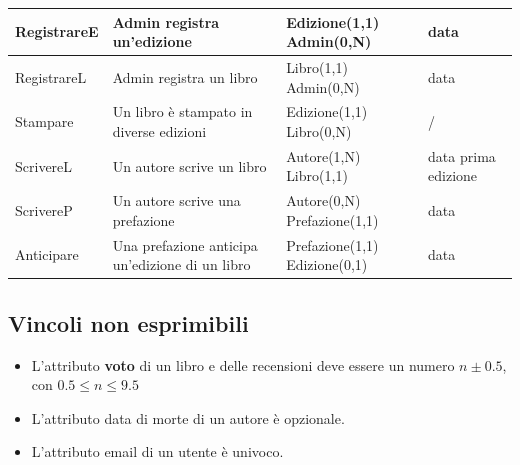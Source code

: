 \documentclass{article}
\begin{document}
\begin{center}
\begin{longtable}{|p{2cm}|p{4cm}|p{3cm}|p{2	cm}|}
		RegistrareE                               & Admin registra un'edizione                             &
		Edizione(1,1)  \vphantom{2}Admin(0,N)     & data                                                                                                    \\
		\hline

		RegistrareL                               & Admin registra un libro                                &
		Libro(1,1)  \vphantom{2}Admin(0,N)        & data                                                                                                    \\
		\hline

		Stampare                                  & Un libro è stampato in diverse edizioni                &
		Edizione(1,1) \vphantom{2}Libro(0,N)      & /                                                                                                       \\
		\hline

		ScrivereL                                 & Un autore scrive un libro                              &
		Autore(1,N) \vphantom{2}Libro(1,1)        & data prima edizione                                                                                     \\
		\hline

		ScrivereP                                 & Un autore scrive una prefazione                        &
		Autore(0,N) \vphantom{2}Prefazione(1,1)   & data                                                                                                    \\
		\hline


		Anticipare                                & Una prefazione anticipa un'edizione di un libro        &
		Prefazione(1,1) \vphantom{2}Edizione(0,1) & data                                                                                                    \\
		\hline
	\end{longtable}
\end{center}

\subsection{Vincoli non esprimibili}
\footnotesize
\begin{itemize}
	\item L'attributo \textbf{voto} di un libro e delle recensioni deve essere un numero $n \pm 0.5$, con $0.5 \leq n \leq 9.5$
	\item L'attributo data di morte di un autore è opzionale.
	\item L'attributo email di un utente è univoco.
\end{itemize}
\end{document}
